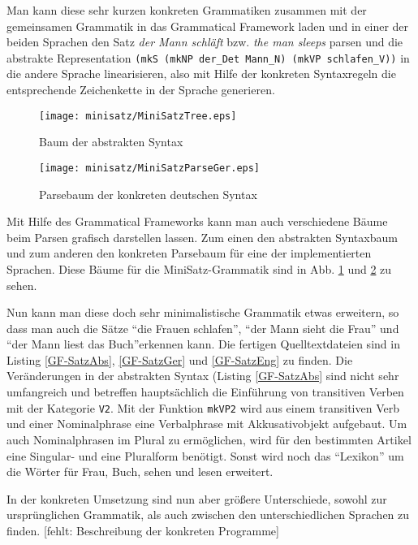 \documentclass[12pt,abstract=on]{scrreprt}
\begin{document}
Man kann diese sehr kurzen konkreten Grammatiken zusammen mit der gemeinsamen Grammatik in das Grammatical Framework laden und in einer der beiden Sprachen den Satz \textit{der Mann schläft} bzw. \textit{the man sleeps} parsen und die abstrakte Representation \texttt{(mkS (mkNP der\_Det Mann\_N) (mkVP schlafen\_V))} in die andere Sprache linearisieren, also mit Hilfe der konkreten Syntaxregeln die entsprechende Zeichenkette in der Sprache generieren. \par
\begin{figure}
\texttt{[image: minisatz/MiniSatzTree.eps]}
\caption{Baum der abstrakten Syntax}\label{MiniSatz-AbsTree}
\end{figure}
\begin{figure}
\texttt{[image: minisatz/MiniSatzParseGer.eps]}
\caption{Parsebaum der konkreten deutschen Syntax}\label{MiniSatz-ParseGer}
\end{figure}
Mit Hilfe des Grammatical Frameworks kann man auch verschiedene Bäume beim Parsen grafisch darstellen lassen. Zum einen den abstrakten Syntaxbaum und zum anderen den konkreten Parsebaum für eine der implementierten Sprachen. Diese Bäume für die MiniSatz-Grammatik sind in Abb. \ref{MiniSatz-AbsTree} und \ref{MiniSatz-ParseGer} zu sehen.

Nun kann man diese doch sehr minimalistische Grammatik etwas erweitern, so dass man auch die Sätze ``die Frauen schlafen'', ``der Mann sieht die Frau'' und ``der Mann liest das Buch''erkennen kann. Die fertigen Quelltextdateien sind in Listing \ref{GF-SatzAbs}, \ref{GF-SatzGer} und \ref{GF-SatzEng} zu finden. Die Veränderungen in der abstrakten Syntax (Listing \ref{GF-SatzAbs} sind nicht sehr umfangreich und betreffen hauptsächlich die Einführung von transitiven Verben mit der Kategorie \texttt{V2}. Mit der Funktion \texttt{mkVP2} wird aus einem transitiven Verb und einer Nominalphrase eine Verbalphrase mit Akkusativobjekt aufgebaut. Um auch Nominalphrasen im Plural zu ermöglichen, wird für den bestimmten Artikel eine Singular- und eine Pluralform benötigt. Sonst wird noch das ``Lexikon'' um die Wörter für Frau, Buch, sehen und lesen erweitert. \par

In der konkreten Umsetzung sind nun aber größere Unterschiede, sowohl zur ursprünglichen Grammatik, als auch zwischen den unterschiedlichen Sprachen zu finden. [fehlt: Beschreibung der konkreten Programme]

\FloatBarrier
\end{document}
